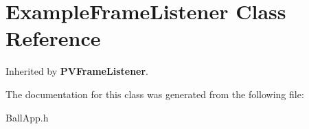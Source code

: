 \section{ExampleFrameListener Class Reference}
\label{class_example_frame_listener}
Inherited by {\bf PVFrameListener}.



The documentation for this class was generated from the following file:\begin{CompactItemize}
\item 
BallApp.h\end{CompactItemize}
